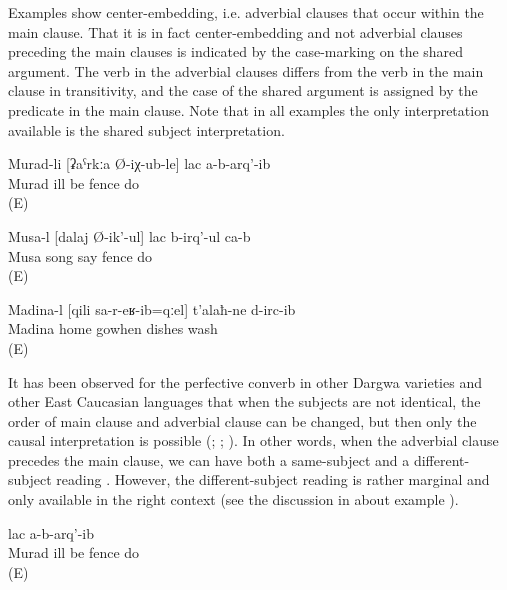 Examples  show center-embedding, i.e. adverbial clauses that occur within the main clause. That it is in fact center-embedding and not adverbial clauses preceding the main clauses is indicated by the case-marking on the shared argument. The verb in the adverbial clauses differs from the verb in the main clause in transitivity, and the case of the shared argument is assigned by the predicate in the main clause. Note that in all examples the only interpretation available is the shared subject interpretation. 
%
\begin{exe}
	\ex	\label{ex:‎When / Because Murad got ill he did not build the fence}
	\gll	Murad-li	[ʡaˁrkːa	Ø-iχ-ub-le]	lac	a-b-arq'-ib\\
		Murad	ill	be	fence	do\\
	\glt	{} (E)

	\ex	\label{ex:Musa is singing a song and building the fence}
	\gll	Musa-l	[dalaj	Ø-ik'-ul]	lac	b-irq'-ul	ca-b\\
		Musa	song	say	fence	do	\\
	\glt	{} (E)

	\ex	\label{ex:‎Madina, having come home, washed the dishes}
	\gll	Madina-l	[qili	sa-r-eʁ-ib=qːel]	t'alaħ-ne	d-irc-ib\\
		Madina	home	gowhen	dishes	wash\\
	\glt	{} (E)
\end{exe}

It has been observed for the perfective converb in other Dargwa varieties and other East Caucasian languages that when the subjects are not identical, the order of main clause and adverbial clause can be changed, but then only the causal interpretation is possible (\citealp{Belyaev2010}; \citealp{Kustova2015}; \citealp{Kazenin.Testelets2004}). In other words, when the adverbial clause precedes the main clause, we can have both a same-subject and a different-subject reading . However, the different-subject reading is rather marginal and only available in the right context (see the discussion in  about example ).
%
\begin{exe}
	\ex	\label{ex:‎When / Because Murad got ill he (= Murad or some other person) did not build the fence}
		lac	a-b-arq'-ib\\
		Murad	ill	be	fence	do\\
	\glt	{} (E)
\end{exe}

